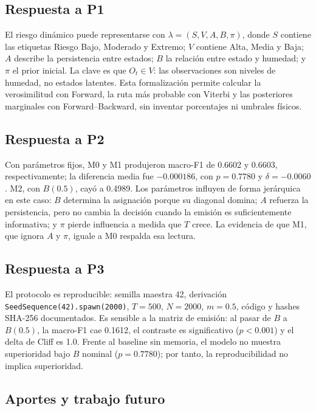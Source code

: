 \documentclass[11pt,letterpaper]{article}
\begin{document}
\subsection{Respuesta a P1}

El riesgo dinámico puede representarse con \(\lambda=(S,V,A,B,\pi)\), donde \(S\) contiene las etiquetas Riesgo Bajo, Moderado y Extremo; \(V\) contiene Alta, Media y Baja; \(A\) describe la persistencia entre estados; \(B\) la relación entre estado y humedad; y \(\pi\) el prior inicial. La clave es que \(O_t\in V\): las observaciones son niveles de humedad, no estados latentes. Esta formalización permite calcular la verosimilitud con Forward, la ruta más probable con Viterbi y las posteriores marginales con Forward--Backward, sin inventar porcentajes ni umbrales físicos.

\subsection{Respuesta a P2}

Con parámetros fijos, M0 y M1 produjeron macro-F1 de 0.6602 y 0.6603, respectivamente; la diferencia media fue \(-0.000186\), con \(p=0.7780\) y \(\delta=-0.0060\). M2, con \(B(0.5)\), cayó a 0.4989. Los parámetros influyen de forma jerárquica en este caso: \(B\) determina la asignación porque su diagonal domina; \(A\) refuerza la persistencia, pero no cambia la decisión cuando la emisión es suficientemente informativa; y \(\pi\) pierde influencia a medida que \(T\) crece. La evidencia de que M1, que ignora \(A\) y \(\pi\), iguale a M0 respalda esa lectura.

\subsection{Respuesta a P3}

El protocolo es reproducible: semilla maestra 42, derivación \texttt{SeedSequence(42).spawn(2000)}, \(T=500\), \(N=2000\), \(m=0.5\), código y hashes SHA-256 documentados. Es sensible a la matriz de emisión: al pasar de \(B\) a \(B(0.5)\), la macro-F1 cae 0.1612, el contraste es significativo (\(p<0.001\)) y el delta de Cliff es 1.0. Frente al baseline sin memoria, el modelo no muestra superioridad bajo \(B\) nominal (\(p=0.7780\)); por tanto, la reproducibilidad no implica superioridad.

\subsection{Aportes y trabajo futuro}
\end{document}

